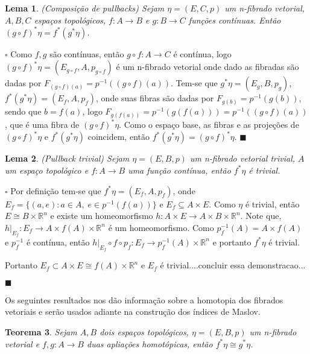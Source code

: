 \documentclass[12pt]{book}
\newtheorem{teorema}{Teorema}[section]
\newtheorem{lema}[teorema]{Lema}
\newenvironment{prova}[1]{$\square$ #1}{\hfill$\blacksquare$}
\newcommand{\real}[1]{\mathbb{R}^{#1}}
\newcommand{\alerta}[1]{{\color{red}#1}}
\begin{document}
	\begin{lema}\label{pullback_composicao}
		(Composição de pullbacks) Sejam $\eta =(E, C, p)$ um n-fibrado vetorial, $A, B, C$ espaços topológicos, $f:A\to B$ e $g:B\to C$ funções contínuas. Então $(g\circ f)^{*} \eta= f^{*}(g^{*}\eta)$.
	\end{lema}
	\begin{prova}
		Como $f, g$ são contínuas, então $g\circ f:A\to C$ é contínua, logo $(g\circ f)^{*}\eta = (E_{g\circ f}, A, p_{g\circ f})$ é um n-fibrado vetorial onde dado as fibradas são dadas por $F_{(g\circ f)(a)} = p^{-1}((g\circ f)(a))$. Tem-se que $g^{*}\eta=(E_{g}, B, p_{g})$, $f^{*}(g^{*}\eta) = (E_{f}, A, p_{f})$, onde suas fibras são dadas por $F_{g(b)} = p^{-1}(g(b))$, sendo que $b=f(a)$, logo  $F_{g(f(a))} = p^{-1}(g(f(a))) = p^{-1}((g \circ f)(a))$, que é uma fibra de $(g\circ f)^{*}\eta$. Como o espaço base, as fibras e as projeções de $(g\circ f)^{*}\eta$ e $f^{*}(g^{*}\eta)$ coincidem, então $f^{*}(g^{*}\eta) = (g\circ f)^{*}\eta$.
	\end{prova}
	\begin{lema}\label{pullback_trivial}
		(Pullback trivial) Sejam $\eta = (E, B, p)$ um n-fibrado vetorial trivial, $A$ um espaço topológico e $f:A\to B$ uma função contínua, então $f^{*}\eta$ é trivial.
	\end{lema}
	\begin{prova}
		Por definição tem-se que $f^{*}\eta = (E_{f}, A, p_{f})$, onde $E_{f}=\{(a, e): a\in A,\; e \in p^{-1}(f(a)) \}$ e $E_{f} \subseteq A\times E$. Como $\eta$ é trivial, então $E \cong B\times \real{n}$ e existe um homeomorfismo $h: A\times E \to A\times B\times \real{n}$. Note que, $h|_{E_{f}}: E_{f}\to A\times f(A)\times \real{n} $ é um homeomorfismo. Como $p_{f}^{-1}(A) = A\times f(A)$ e $p^{-1}_{f}$ é contínua, então $h|_{E_{f}}\circ f\circ p_{f}: E_{f}\to p_{f}^{-1}(A)\times \real{n} $ e portanto $f^{*}\eta$ é trivial.
		\alerta{
			
			Portanto $E_{f} \subset A\times E \cong f(A)\times \real{n}$ e $E_{f}$ é trivial....concluir essa demonstracao...}
	\end{prova}
	
	Os seguintes resultados nos dão informação sobre a homotopia dos fibrados vetoriais e serão usados adiante na construção dos índices de Maslov.
	
	\begin{teorema}\label{pullback_isomorfismo}
		Sejam $A, B$ dois espaços topológicos, $\eta=(E, B, p)$ um n-fibrado vetorial e $f,g: A\to B$ duas apliações homotópicas, então $f^{*}\eta \cong g^{*}\eta$.
	\end{teorema}
	
\end{document}
